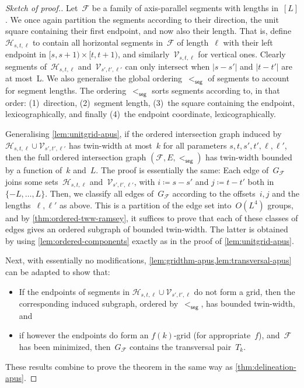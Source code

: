 \documentclass[a4paper,UKenglish,cleveref,thm-restate]{lipics-v2021}
\theoremstyle{remark}
\newcommand{\eqdef}{\coloneqq}
\newcommand{\Fc}{\mathcal{F}}
\newcommand{\Hc}{\mathcal{H}}
\newcommand{\Vc}{\mathcal{V}}
\newcommand{\seg}{\mathsf{seg}}
\begin{document}
\begin{proof}[Sketch of proof.]
    Let~$\Fc$ be a family of axis-parallel segments with lengths in~$[L]$.
    We once again partition the segments according to their direction, the unit square containing their first endpoint, and now also their length.
    That is, define~$\Hc_{s,t,\ell}$ to contain all horizontal segments in~$\Fc$ of length~$\ell$ with their left endpoint in $[s,s+1) \times [t,t+1)$, and similarly~$\Vc_{s,t,\ell}$ for vertical ones.
    Clearly segments of~$\Hc_{s,t,\ell}$ and~$\Vc_{s',t',\ell'}$ can only intersect when $|s-s'|$ and $|t-t'|$ are at most~L.
    We also generalise the global ordering~$<_\seg$ of segments to account for segment lengths.
    The ordering~$<_\seg$ sorts segments according to, in that order: (1)~direction, (2)~segment length, (3)~the square containing the endpoint, lexicographically, and finally (4)~the endpoint coordinate, lexicographically.

    Generalising \cref{lem:unitgrid-apus}, if the ordered intersection graph induced by~$\Hc_{s,t,\ell} \cup \Vc_{s',t',\ell'}$ has twin-width at most~$k$ for all parameters $s,t,s',t',\ell,\ell'$,
    then the full ordered intersection graph $(\Fc,E,<_\seg)$ has twin-width bounded by a function of~$k$ and~$L$.
    The proof is essentially the same:
    Each edge of~$G_\Fc$ joins some sets~$\Hc_{s,t,\ell}$ and~$\Vc_{s',t',\ell'}$,
    with $i \eqdef s-s'$ and $j \eqdef t-t'$ both in~$\{-L,\dots,L\}$.
    Then, we classify all edges of~$G_\Fc$ according to the offsets~$i,j$ and the lengths~$\ell,\ell'$ as above.
    This is a partition of the edge set into~$O(L^4)$ groups, and by \cref{thm:ordered-tww-ramsey}, it suffices to prove that each of these classes of edges gives an ordered subgraph of bounded twin-width.
    The latter is obtained by using \cref{lem:ordered-components} exactly as in the proof of \cref{lem:unitgrid-apus}.

    Next, with essentially no modifications, \cref{lem:gridthm-apus,lem:transversal-apus} can be adapted to show that:
    \begin{itemize}
        \item If the endpoints of segments in $\Hc_{s,t,\ell} \cup \Vc_{s',t',\ell}$ do not form a grid,
        then the corresponding induced subgraph, ordered by~$<_\seg$, has bounded twin-width, and
        \item if however the endpoints do form an $f(k)$-grid (for appropriate~$f$), and~$\Fc$ has been minimized, then~$G_\Fc$ contains the transversal pair~$T_k$.
    \end{itemize}
    These results combine to prove the theorem in the same way as \cref{thm:delineation-apus}.
\end{proof}
\end{document}
